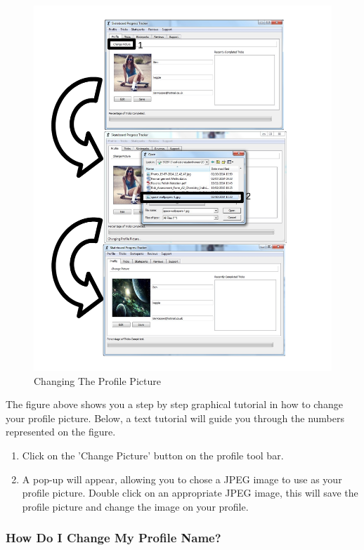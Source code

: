 \begin{figure}[H]
    \includegraphics[width=\textwidth]{./Manual/Images/SaveProfilePicture.pdf}
    \caption{Changing The Profile Picture} \label{fig:Change Profile Picture}
\end{figure}

The figure above shows you a step by step graphical tutorial in how to change your profile picture. Below, a text tutorial will guide you through the numbers represented on the figure.
\begin{enumerate}
\item Click on the 'Change Picture' button on the profile tool bar.
\item A pop-up will appear, allowing you to chose a JPEG image to use as your profile picture. Double click on an appropriate JPEG image, this will save the profile picture and change the image on your profile.
\end{enumerate}


\subsubsection{How Do I Change My Profile Name?} \label{ChangeName}

